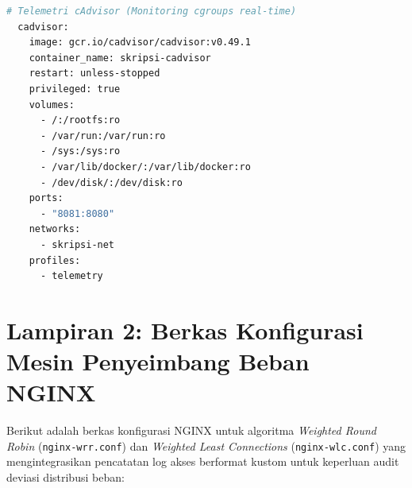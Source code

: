 \begin{lstlisting}[language=bash, caption={Berkas docker-compose.yml Kluster Kontainer Heterogen}]
  # Telemetri cAdvisor (Monitoring cgroups real-time)
  cadvisor:
    image: gcr.io/cadvisor/cadvisor:v0.49.1
    container_name: skripsi-cadvisor
    restart: unless-stopped
    privileged: true
    volumes:
      - /:/rootfs:ro
      - /var/run:/var/run:ro
      - /sys:/sys:ro
      - /var/lib/docker/:/var/lib/docker:ro
      - /dev/disk/:/dev/disk:ro
    ports:
      - "8081:8080"
    networks:
      - skripsi-net
    profiles:
      - telemetry
\end{lstlisting}

\newpage

\section*{Lampiran 2: Berkas Konfigurasi Mesin Penyeimbang Beban NGINX}

Berikut adalah berkas konfigurasi NGINX untuk algoritma \textit{Weighted Round Robin} (\texttt{nginx-wrr.conf}) dan \textit{Weighted Least Connections} (\texttt{nginx-wlc.conf}) yang mengintegrasikan pencatatan log akses berformat kustom untuk keperluan audit deviasi distribusi beban:

